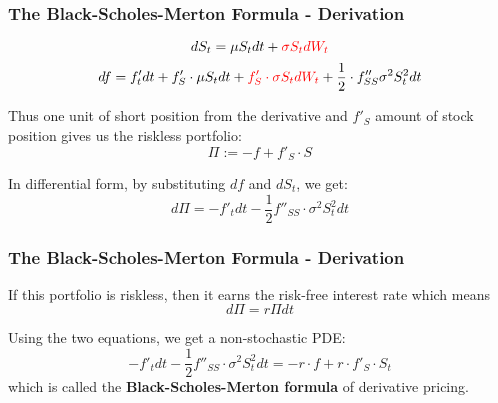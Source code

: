 \documentclass[ignorenonframetext, 9pt]{beamer}
\begin{document}
\begin{frame}
\frametitle{The Black-Scholes-Merton Formula - Derivation}

\begin{equation}
    dS_t = \mu S_t dt + \color{red}\sigma S_t dW_t \color{black}
\end{equation}
\begin{equation}
df = f'_t dt + f'_S \cdot \mu S_t dt + \color{red} f'_S \cdot \sigma S_t dW_t \color{black} + \frac{1}{2}\cdot f''_{SS} \sigma^2 S_t^2 dt
\end{equation} \newline

\pause

Thus one unit of short position from the derivative and $f'_S$ amount of stock position gives us the riskless portfolio: 
\begin{equation}
\Pi := -f + f'_S \cdot S
\end{equation} \newline

\pause

In differential form, by substituting $df$ and $dS_t$, we get:
\begin{equation}
d\Pi = -f'_t dt - \frac{1}{2} f''_{SS} \cdot \sigma^2 S_t^2 dt
\end{equation}

\end{frame}

\begin{frame}
\frametitle{The Black-Scholes-Merton Formula - Derivation}

If this portfolio is riskless, then it earns the risk-free interest rate which means
\begin{equation}
d\Pi = r\Pi dt
\end{equation} \newline

\pause

Using the two equations, we get a non-stochastic PDE:
\begin{equation}
-f'_t dt - \frac{1}{2} f''_{SS} \cdot \sigma^2 S_t^2 dt = -r \cdot f + r\cdot f'_S \cdot S_t
\end{equation}
which is called the \textbf{Black-Scholes-Merton formula} of derivative pricing. \newline

\end{frame}
\end{document}
